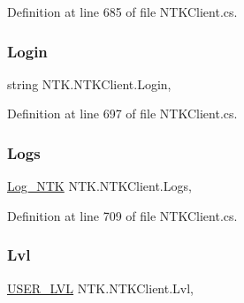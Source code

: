 Definition at line 685 of file N\+T\+K\+Client.\+cs.

\mbox{\label{class_n_t_k_1_1_n_t_k_client_a80950339569dd3c3c0e049bbadcdbb74}} 
\subsubsection{\texorpdfstring{Login}{Login}}
{\footnotesize\ttfamily string N\+T\+K.\+N\+T\+K\+Client.\+Login\hspace{0.3cm}{\ttfamily [get]}, {\ttfamily [set]}}







Definition at line 697 of file N\+T\+K\+Client.\+cs.

\mbox{\label{class_n_t_k_1_1_n_t_k_client_aa64d9ddcb65448b5862429f881bb3b2f}} 
\subsubsection{\texorpdfstring{Logs}{Logs}}
{\footnotesize\ttfamily \mbox{\hyperlink{class_n_t_k_1_1_other_1_1_log___n_t_k}{Log\+\_\+\+N\+TK}} N\+T\+K.\+N\+T\+K\+Client.\+Logs\hspace{0.3cm}{\ttfamily [get]}, {\ttfamily [set]}}







Definition at line 709 of file N\+T\+K\+Client.\+cs.

\mbox{\label{class_n_t_k_1_1_n_t_k_client_a5068e826f2309f9a3e8e85c8e5d2f058}} 
\subsubsection{\texorpdfstring{Lvl}{Lvl}}
{\footnotesize\ttfamily \mbox{\hyperlink{namespace_n_t_k_a1a2136a0cde3a719c9188a4d515e9f1b}{U\+S\+E\+R\+\_\+\+L\+VL}} N\+T\+K.\+N\+T\+K\+Client.\+Lvl\hspace{0.3cm}{\ttfamily [get]}, {\ttfamily [set]}}







